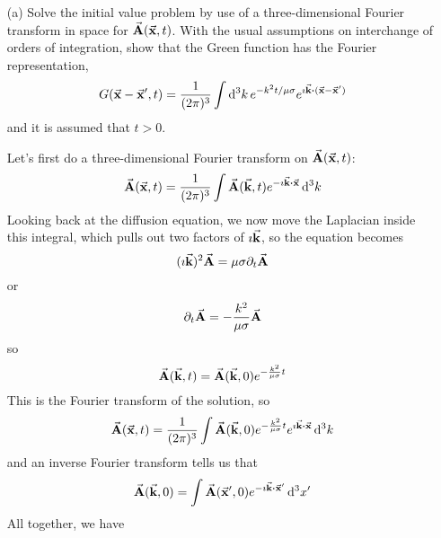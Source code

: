 \documentclass[a4paper,twoside]{article}
\begin{document}
\begin{itemize}
    \item[(a)] Solve the initial value problem by use of a three-dimensional Fourier transform in space for $ \va{A}( \va{x}, t) $. With the usual assumptions on interchange of orders of integration, show that the Green function has the Fourier representation,
        \begin{equation}
            G( \va{x}- \va{x}', t) = \frac{1}{(2 \pi)^3} \int \dd[3]{k} e^{-k^2 t/ \mu \sigma} e^{\imath \va{k} \vdot ( \va{x} - \va{x}')}
        \end{equation}
        and it is assumed that $ t>0 $.
        \begin{problem}
            Let's first do a three-dimensional Fourier transform on $ \va{A}( \va{x},t) $:
            \begin{equation}
                \va{A}( \va{x},t) = \frac{1}{(2 \pi)^3} \int \va{A}( \va{k},t) e^{- \imath \va{k} \vdot \va{x}} \dd[3]{k}
            \end{equation}
            Looking back at the diffusion equation, we now move the Laplacian inside this integral, which pulls out two factors of $ \imath \va{k} $, so the equation becomes
            \begin{equation}
                (\imath \va{k})^2 \va{A} = \mu \sigma \partial_t \va{A} 
            \end{equation}
            or
            \begin{equation}
                \partial_t \va{A} = - \frac{k^2}{\mu \sigma} \va{A}
            \end{equation}
            so
            \begin{equation}
                \va{A}( \va{k},t) = \va{A}( \va{k}, 0) e^{- \frac{k^2}{\mu \sigma} t}
            \end{equation}
            This is the Fourier transform of the solution, so
            \begin{equation}
                \va{A}( \va{x},t) = \frac{1}{(2 \pi)^3} \int \va{A}( \va{k}, 0) e^{- \frac{k^2}{\mu \sigma} t} e^{\imath \va{k} \vdot \va{x}} \dd[3]{k}
            \end{equation}
            and an inverse Fourier transform tells us that
            \begin{equation}
                \va{A}( \va{k},0) = \int \va{A}( \va{x}',0) e^{- \imath \va{k} \vdot \va{x}'} \dd[3]{x'}
            \end{equation}
            All together, we have

\end{problem}
\end{itemize}
\end{document}
